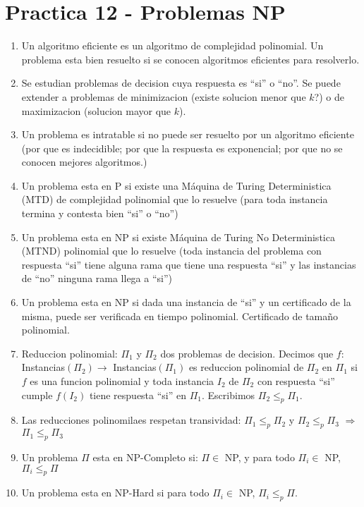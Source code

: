 \section{Practica 12 - Problemas NP}

\begin{enumerate}
\item Un algoritmo eficiente es un algoritmo de complejidad polinomial. Un problema esta bien resuelto si se conocen algoritmos eficientes para resolverlo.
\item Se estudian problemas de decision cuya respuesta es ``si'' o ``no''. Se puede extender a problemas de minimizacion (existe solucion menor que $k$?) o de maximizacion (solucion mayor que $k$).
\item Un problema es intratable si no puede ser resuelto por un algoritmo eficiente (por que es indecidible; por que la respuesta es exponencial; por que no se conocen mejores algoritmos.)
\item Un problema esta en P si existe una Máquina de Turing Deterministica (MTD) de complejidad polinomial que lo resuelve (para toda instancia termina y contesta bien ``si'' o ``no'')
\item Un problema esta en NP si existe Máquina de Turing No Deterministica (MTND) polinomial que lo resuelve (toda instancia del problema con respuesta ``si'' tiene alguna rama que tiene una respuesta ``si'' y las instancias de ``no'' ninguna rama llega a ``si'')
\item Un problema esta en NP si dada una instancia de ``si'' y un certificado de la misma, puede ser verificada en tiempo polinomial. Certificado de tamaño polinomial.
\item Reduccion polinomial: $\Pi_{1}$ y $\Pi_{2}$ dos problemas de decision. Decimos que $f:$ Instancias$(\Pi_{2}) \rightarrow$ Instancias$(\Pi_{1})$ es reduccion polinomial de $\Pi_{2}$ en $\Pi_{1}$ si $f$ es una funcion polinomial y toda instancia $I_{2}$ de $\Pi_{2}$ con respuesta ``si'' cumple $f(I_{2})$ tiene respuesta ``si'' en $\Pi_{1}$. Escribimos $\Pi_{2} \leq_{p} \Pi_{1}$.
\item Las reducciones polinomilaes respetan transividad: $\Pi_{1} \leq_{p} \Pi_{2}$ y $\Pi_{2} \leq_{p} \Pi_{3}$ $\Rightarrow$ $\Pi_{1} \leq_{p} \Pi_{3}$
\item Un problema $\Pi$ esta en NP-Completo si: $\Pi \in$ NP, y para todo $\Pi_{i} \in$ NP, $\Pi_{i} \leq_{p} \Pi$
\item Un problema esta en NP-Hard si para todo $\Pi_{i} \in$ NP, $\Pi_{i} \leq_{p} \Pi$.

\end{enumerate}
